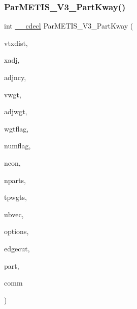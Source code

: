 \subsubsection{\texorpdfstring{Par\+M\+E\+T\+I\+S\+\_\+\+V3\+\_\+\+Part\+Kway()}{ParMETIS\_V3\_PartKway()}}
{\footnotesize\ttfamily int \hyperlink{a00843_a238347d7669f8f1e9c83bfe63a2730c4}{\+\_\+\+\_\+cdecl} Par\+M\+E\+T\+I\+S\+\_\+\+V3\+\_\+\+Part\+Kway (\begin{DoxyParamCaption}\item[{\hyperlink{a00876_aaa5262be3e700770163401acb0150f52}{idx\+\_\+t} $\ast$}]{vtxdist,  }\item[{\hyperlink{a00876_aaa5262be3e700770163401acb0150f52}{idx\+\_\+t} $\ast$}]{xadj,  }\item[{\hyperlink{a00876_aaa5262be3e700770163401acb0150f52}{idx\+\_\+t} $\ast$}]{adjncy,  }\item[{\hyperlink{a00876_aaa5262be3e700770163401acb0150f52}{idx\+\_\+t} $\ast$}]{vwgt,  }\item[{\hyperlink{a00876_aaa5262be3e700770163401acb0150f52}{idx\+\_\+t} $\ast$}]{adjwgt,  }\item[{\hyperlink{a00876_aaa5262be3e700770163401acb0150f52}{idx\+\_\+t} $\ast$}]{wgtflag,  }\item[{\hyperlink{a00876_aaa5262be3e700770163401acb0150f52}{idx\+\_\+t} $\ast$}]{numflag,  }\item[{\hyperlink{a00876_aaa5262be3e700770163401acb0150f52}{idx\+\_\+t} $\ast$}]{ncon,  }\item[{\hyperlink{a00876_aaa5262be3e700770163401acb0150f52}{idx\+\_\+t} $\ast$}]{nparts,  }\item[{\hyperlink{a00876_a1924a4f6907cc3833213aba1f07fcbe9}{real\+\_\+t} $\ast$}]{tpwgts,  }\item[{\hyperlink{a00876_a1924a4f6907cc3833213aba1f07fcbe9}{real\+\_\+t} $\ast$}]{ubvec,  }\item[{\hyperlink{a00876_aaa5262be3e700770163401acb0150f52}{idx\+\_\+t} $\ast$}]{options,  }\item[{\hyperlink{a00876_aaa5262be3e700770163401acb0150f52}{idx\+\_\+t} $\ast$}]{edgecut,  }\item[{\hyperlink{a00876_aaa5262be3e700770163401acb0150f52}{idx\+\_\+t} $\ast$}]{part,  }\item[{M\+P\+I\+\_\+\+Comm $\ast$}]{comm }\end{DoxyParamCaption})}


